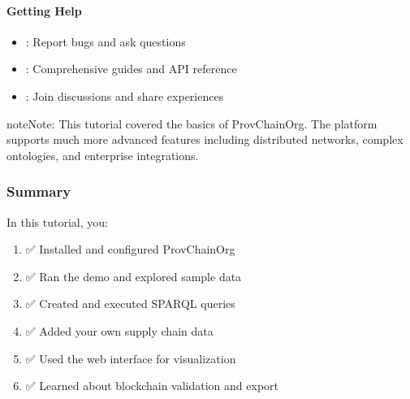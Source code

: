 \documentclass[letterpaper,10pt,english]{sphinxmanual}
\begin{document}
\paragraph{Getting Help}
\label{\detokenize{tutorials/first-supply-chain:getting-help}}\begin{itemize}
\item {} 
\sphinxAtStartPar
{}: Report bugs and ask questions

\item {} 
\sphinxAtStartPar
{}: Comprehensive guides and API reference

\item {} 
\sphinxAtStartPar
{}: Join discussions and share experiences

\end{itemize}

\begin{sphinxadmonition}{note}{Note:}
\sphinxAtStartPar
This tutorial covered the basics of ProvChainOrg. The platform supports much more advanced features including distributed networks, complex ontologies, and enterprise integrations.
\end{sphinxadmonition}


\subsubsection{Summary}
\label{\detokenize{tutorials/first-supply-chain:summary}}
\sphinxAtStartPar
In this tutorial, you:
\begin{enumerate}
%
\item {} 
\sphinxAtStartPar
✅ Installed and configured ProvChainOrg

\item {} 
\sphinxAtStartPar
✅ Ran the demo and explored sample data

\item {} 
\sphinxAtStartPar
✅ Created and executed SPARQL queries

\item {} 
\sphinxAtStartPar
✅ Added your own supply chain data

\item {} 
\sphinxAtStartPar
✅ Used the web interface for visualization

\item {} 
\sphinxAtStartPar
✅ Learned about blockchain validation and export

\end{enumerate}
\end{document}
